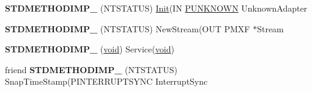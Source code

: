 \begin{DoxyCompactItemize}
{\bfseries S\+T\+D\+M\+E\+T\+H\+O\+D\+I\+M\+P\+\_\+} (N\+T\+S\+T\+A\+T\+US) \hyperlink{class_init}{Init}(IN \hyperlink{interface_i_unknown}{P\+U\+N\+K\+N\+O\+WN} Unknown\+Adapter
\item 
\mbox{\label{class_c_miniport_d_mus_u_a_r_t_a407cd544f6a9ddaf3f408d479e21934b}} 
{\bfseries S\+T\+D\+M\+E\+T\+H\+O\+D\+I\+M\+P\+\_\+} (N\+T\+S\+T\+A\+T\+US) New\+Stream(O\+UT P\+M\+XF $\ast$Stream
\item 
\mbox{\label{class_c_miniport_d_mus_u_a_r_t_a8c70ff9f3483c697b0e2e6968f64f15e}} 
{\bfseries S\+T\+D\+M\+E\+T\+H\+O\+D\+I\+M\+P\+\_\+} (\hyperlink{interfacevoid}{void}) Service(\hyperlink{interfacevoid}{void})
\item 
\mbox{\label{class_c_miniport_d_mus_u_a_r_t_a8aaaab939458f7fcc227c0b47ffe66fe}} 
friend {\bfseries S\+T\+D\+M\+E\+T\+H\+O\+D\+I\+M\+P\+\_\+} (N\+T\+S\+T\+A\+T\+US) Snap\+Time\+Stamp(P\+I\+N\+T\+E\+R\+R\+U\+P\+T\+S\+Y\+NC Interrupt\+Sync
\end{DoxyCompactItemize}
